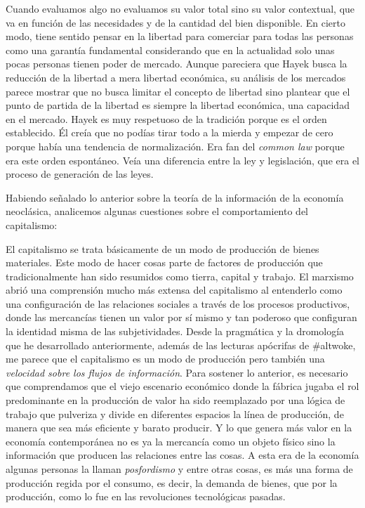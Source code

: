 Cuando evaluamos algo no evaluamos su valor total sino su valor contextual, que va en función de las necesidades y de la cantidad del bien disponible. En cierto modo, tiene sentido pensar en la libertad para comerciar para todas las personas como una garantía fundamental considerando que en la actualidad solo unas pocas personas tienen poder de mercado. Aunque pareciera que Hayek busca la reducción de la libertad a mera libertad económica, su análisis de los mercados parece mostrar que no busca limitar el concepto de libertad sino plantear que el punto de partida de la libertad es siempre la libertad económica, una capacidad en el mercado. Hayek es muy respetuoso de la tradición porque es el orden establecido. Él creía que no podías tirar todo a la mierda y empezar de cero porque había una tendencia de normalización. Era fan del \emph{common law} porque era este orden espontáneo. Veía una diferencia entre la ley y legislación, que era el proceso de generación de las leyes.

Habiendo señalado lo anterior sobre la teoría de la información de la economía neoclásica, analicemos algunas cuestiones sobre el comportamiento del capitalismo:

El capitalismo se trata básicamente de un modo de producción de bienes materiales. Este modo de hacer cosas parte de factores de producción que tradicionalmente han sido resumidos como tierra, capital y trabajo. El marxismo abrió una comprensión mucho más extensa del capitalismo al entenderlo como una configuración de las relaciones sociales a través de los procesos productivos, donde las mercancías tienen un valor por sí mismo y tan poderoso que configuran la identidad misma de las subjetividades. Desde la pragmática y la dromología que he desarrollado anteriormente, además de las lecturas apócrifas de \#altwoke, me parece que el capitalismo es un modo de producción pero también una \emph{velocidad sobre los flujos de información}. Para sostener lo anterior, es necesario que comprendamos que el viejo escenario económico donde la fábrica jugaba el rol predominante en la producción de valor ha sido reemplazado por una lógica de trabajo que pulveriza y divide en diferentes espacios la línea de producción, de manera que sea más eficiente y barato producir. Y lo que genera más valor en la economía contemporánea no es ya la mercancía como un objeto físico sino la información que producen las relaciones entre las cosas. A esta era de la economía algunas personas la llaman \emph{posfordismo} y entre otras cosas, es más una forma de producción regida por el consumo, es decir, la demanda de bienes, que por la producción, como lo fue en las revoluciones tecnológicas pasadas.

